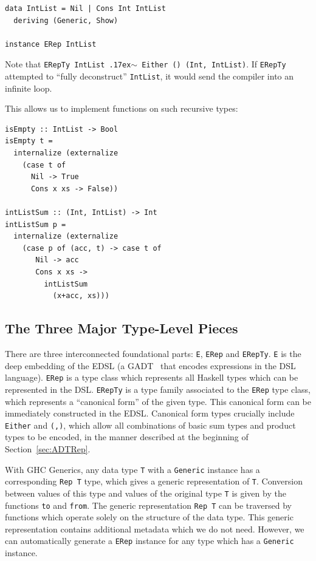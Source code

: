\documentclass[runningheads, a4paper]{llncs}
\newcommand{\typeeq}{\raise.17ex\hbox{$\scriptstyle\mathtt{\sim}$}\,\;}
\newcommand{\ttt}{\texttt}
\begin{document}
\begin{lstlisting}
data IntList = Nil | Cons Int IntList
  deriving (Generic, Show)

instance ERep IntList
\end{lstlisting}

Note that \ttt{ERepTy IntList \typeeq Either () (Int, IntList)}. If \ttt{ERepTy}
attempted to ``fully deconstruct'' \ttt{IntList}, it would send the compiler
into an infinite loop.

This allows us to implement functions on such recursive types:

\begin{lstlisting}
isEmpty :: IntList -> Bool
isEmpty t =
  internalize (externalize
    (case t of
      Nil -> True
      Cons x xs -> False))

intListSum :: (Int, IntList) -> Int
intListSum p =
  internalize (externalize
    (case p of (acc, t) -> case t of
       Nil -> acc
       Cons x xs ->
         intListSum
           (x+acc, xs)))
\end{lstlisting}

\subsection{The Three Major Type-Level Pieces}

There are three interconnected foundational parts: \ttt{E}, \ttt{ERep} and
\ttt{ERepTy}. \ttt{E} is the deep embedding of the EDSL (a GADT~\cite{Vytiniotis:2006:Simple} that encodes
expressions in the DSL language). \ttt{ERep} is a type class which represents
all Haskell types which can be represented in the DSL. \ttt{ERepTy} is a type
family associated to the \ttt{ERep} type class, which represents a ``canonical form''
of the given type. This canonical form can be immediately constructed in the EDSL.
Canonical form types crucially include \ttt{Either} and \ttt{(,)}, which
allow all combinations of basic sum types and product types to be encoded, in the
manner described at the beginning of Section~\ref{sec:ADTRep}.

With GHC Generics, any data type \ttt{T} with a \ttt{Generic} instance has a
corresponding \ttt{Rep T} type, which gives a generic representation of \ttt{T}.
Conversion between values of this type and values of the original type \ttt{T} is
given by the functions \ttt{to} and \ttt{from}. The generic representation \ttt{Rep T}
can be traversed by functions which operate solely on the structure of the data type.
This generic representation contains additional metadata which we do not need.
However, we can automatically generate a \ttt{ERep} instance for any type which
has a \ttt{Generic} instance.
\end{document}
